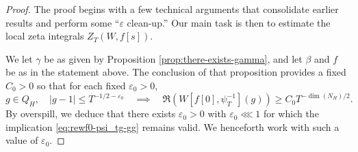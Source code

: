 \documentclass[reqno]{amsart}
\def\eps{\varepsilon}
\theoremstyle{plain} \newtheorem{theorem} {Theorem}
\theoremstyle{definition} \newtheorem{definition} [theorem] {Definition}
\theoremstyle{itplain} %
\numberwithin{equation}{section}
\numberwithin{theorem}{section}
\renewcommand{\geq}{\geqslant}
\renewcommand{\leq}{\leqslant}
\begin{document}
\begin{proof}
  The proof begins with a few technical arguments that consolidate earlier results and perform some ``$\eps$ clean-up.''  Our main task is then to estimate the local zeta integrals $Z_T(W,f[s])$.
  
We let $\gamma$ be as given by Proposition \ref{prop:there-exists-gamma}, and let $\beta$ and $f$ be as in the statement above.  The conclusion of that proposition provides a fixed $C_0 > 0$ so that for each fixed $\eps_0 > 0$,
  \begin{equation}\label{eq:rewf0-psi_tg-gg}
    g \in Q_H, \quad |g - 1| \leq T^{-1/2-\eps_0}
    \quad
    \implies
    \quad 
    \Re(W[f[0], \psi_T^{-1}](g)) \geq C_0 T^{-\dim(N_H)/2}.
  \end{equation}
  By overspill, we deduce that there exists $\eps_0 > 0$ with $\eps_0 \lll 1$ for which the implication \eqref{eq:rewf0-psi_tg-gg} remains valid.  We henceforth work with such a value of $\eps_0$.


\end{proof}
\end{document}
